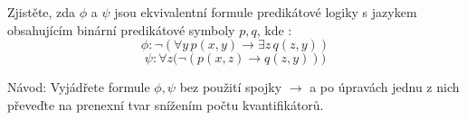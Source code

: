 \subsubsection{} 
Zjistěte, zda $\phi$ a $\psi$ jsou ekvivalentní formule predikátové logiky s
jazykem obsahujícím binární predikátové symboly $p,q$, kde : 
$$\phi : \neg (\forall y\, p(x,y) \rightarrow \exists z\, q(z,y))$$
$$\psi : \forall z \bigl ( \neg (p(x,z) \rightarrow q(z,y) ) \bigr)$$

Návod: Vyjádřete formule $\phi,\psi$ bez použití spojky $\rightarrow$ a po
úpravách jednu z nich převeďte na prenexní tvar snížením počtu kvantifikátorů.

